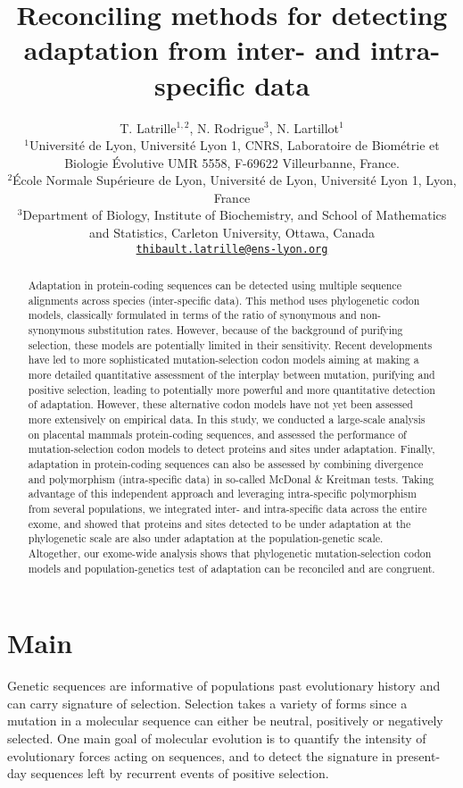 \documentclass{article}
\title{Reconciling methods for detecting adaptation from inter- and intra-specific data}
\author{
	\large
	T. {Latrille}$^{1,2}$, N. {Rodrigue}$^{3}$, N. {Lartillot}$^{1}$ \\
	\normalsize
	$^{1}$Université de Lyon, Université Lyon 1, CNRS, Laboratoire de Biométrie et Biologie Évolutive UMR 5558, F-69622 Villeurbanne, France.\\
	$^{2}$École Normale Supérieure de Lyon, Université de Lyon, Université Lyon 1, Lyon, France\\
	$^{3}$Department of Biology, Institute of Biochemistry, and School of Mathematics and Statistics, Carleton University, Ottawa, Canada \\
	\texttt{\href{mailto:thibault.latrille@ens-lyon.org}{thibault.latrille@ens-lyon.org}} \\
}
\begin{document}
\maketitle

\begin{abstract}
	Adaptation in protein-coding sequences can be detected using multiple sequence alignments across species (inter-specific data).
	This method uses phylogenetic codon models, classically formulated in terms of the ratio of synonymous and non-synonymous substitution rates.
	However, because of the background of purifying selection, these models are potentially limited in their sensitivity.
	Recent developments have led to more sophisticated mutation-selection codon models aiming at making a more detailed quantitative assessment of the interplay between mutation, purifying and positive selection, leading to potentially more powerful and more quantitative detection of adaptation.
	However, these alternative codon models have not yet been assessed more extensively on empirical data.
	In this study, we conducted a large-scale analysis on placental mammals protein-coding sequences, and assessed the performance of mutation-selection codon models to detect proteins and sites under adaptation.
	Finally, adaptation in protein-coding sequences can also be assessed by combining divergence and polymorphism (intra-specific data) in so-called McDonal \& Kreitman tests.
	Taking advantage of this independent approach and leveraging intra-specific polymorphism from several populations, we integrated inter- and intra-specific data across the entire exome, and showed that proteins and sites detected to be under adaptation at the phylogenetic scale are also under adaptation at the population-genetic scale.
	Altogether, our exome-wide analysis shows that phylogenetic mutation-selection codon models and population-genetics test of adaptation can be reconciled and are congruent.
\end{abstract}


\section*{Main}

Genetic sequences are informative of populations past evolutionary history and can carry signature of selection.
Selection takes a variety of forms since a mutation in a molecular sequence can either be neutral, positively or negatively selected.
One main goal of molecular evolution is to quantify the intensity of evolutionary forces acting on sequences, and to detect the signature in present-day sequences left by recurrent events of positive selection.
\end{document}
